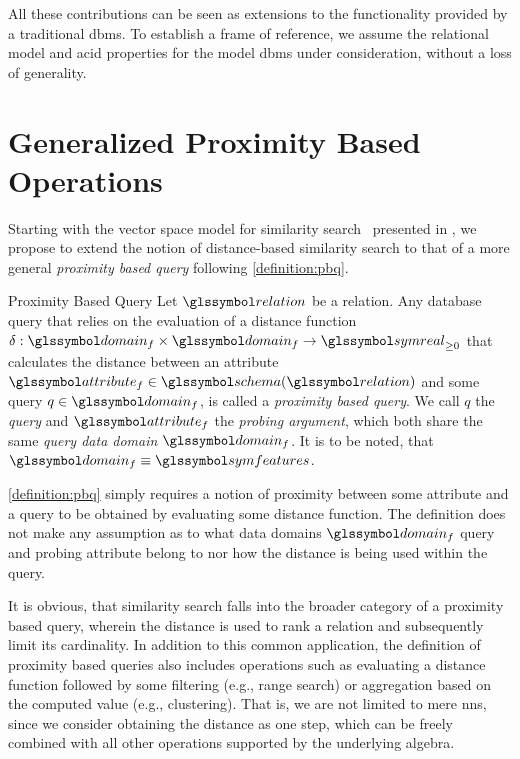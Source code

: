All these contributions can be seen as extensions to the functionality provided by a traditional \acrshort{dbms}. To establish a frame of reference, we assume the relational model and \acrshort{acid} properties for the model \acrshort{dbms} under consideration, without a loss of generality.

\section{Generalized Proximity Based Operations}

Starting with the vector space model for similarity search~\cite{Zezula:2006Similarity} presented in , we propose to extend the notion of distance-based similarity search to that of a more general \emph{proximity based query} following \cref{definition:pbq}.

\begin{definition}[label=definition:pbq]{Proximity Based Query}{}
    Let $\relation$ be a relation. Any database query that relies on the evaluation of a distance function $\delta: \domain_{f} \times \domain_{f} \rightarrow \symreal_{\geq 0}$ that calculates the distance between an attribute $\attribute_{f} \in \schema(\relation)$ and some query $q \in \domain_f$, is called a \emph{proximity based query}. We call $q$ the \emph{query} and $\attribute_{f}$ the \emph{probing argument}, which both share the same \emph{query data domain} $\domain_f$. It is to be noted, that $\domain_f \equiv \symfeatures$. 
\end{definition}

\cref{definition:pbq} simply requires a notion of proximity between some attribute and a query to be obtained by evaluating some distance function. The definition does not make any assumption as to what data domains $\domain_f$ query and probing attribute belong to nor how the distance is being used within the query. 

It is obvious, that similarity search falls into the broader category of a proximity based query, wherein the distance is used to rank a relation and subsequently limit its cardinality. In addition to this common application, the definition of proximity based queries also includes operations such as evaluating a distance function followed by some filtering (e.g., range search) or aggregation based on the computed value (e.g., clustering). That is, we are not limited to mere \acrshort{nns}, since we consider obtaining the distance as one step, which can be freely combined with all other operations supported by the underlying algebra.

